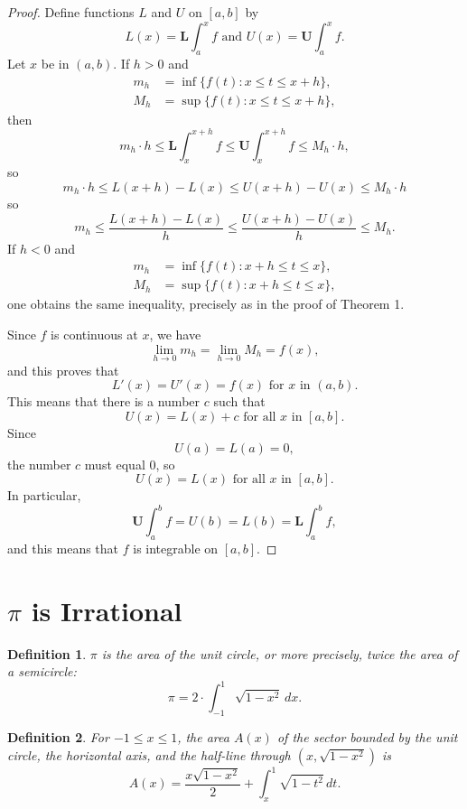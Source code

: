 \documentclass{article}
\numberwithin{corollary}{subsection}
\newtheorem{definition}{Definition}
\numberwithin{definition}{subsection}
\numberwithin{lemma}{subsection}
\numberwithin{theorem}{subsection}
\begin{document}
\begin{proof}
  Define functions $L$ and $U$ on $[a, b]$ by \[
    L(x) = \textbf{L}\int_a^x f \text{ and } U(x) = \textbf{U}\int_a^x f.
  \] Let $x$ be in $(a, b)$. If $h > 0$ and
  \begin{align*}
    m_h &= \inf\{f(t): x \leq t \leq x + h\}, \\
    M_h &= \sup\{f(t): x \leq t \leq x + h\},
  \end{align*}
  then \[
    m_h \cdot h \leq \textbf{L}\int_x^{x + h} f \leq \textbf{U}\int_x^{x + h} f
    \leq M_h \cdot h,
  \] so \[
    m_h \cdot h \leq L(x + h) - L(x) \leq U(x + h) - U(x) \leq M_h \cdot h
  \] so \[
    m_h \leq \frac{L(x + h) - L(x)}{h} \leq \frac{U(x + h) - U(x)}{h} \leq M_h.
  \] If $h < 0$ and
  \begin{align*}
    m_h &= \inf\{f(t): x + h \leq t \leq x\}, \\
    M_h &= \sup\{f(t): x + h \leq t \leq x\},
  \end{align*}
  one obtains the same inequality, precisely as in the proof of
  Theorem 1.

  Since $f$ is continuous at $x$, we have \[
    \lim_{h \to 0} m_h = \lim_{h \to 0} M_h = f(x),
  \] and this proves that \[
    L'(x) = U'(x) = f(x) \text{ for } x \text{ in } (a, b).
  \] This means that there is a number $c$ such that \[
    U(x) = L(x) + c \text{ for all } x \text{ in } [a, b].
  \] Since \[
    U(a) = L(a) = 0,
  \] the number $c$ must equal 0, so \[
    U(x) = L(x) \text{ for all } x \text{ in } [a, b].
  \] In particular, \[
    \textbf{U}\int_a^b f = U(b) = L(b) = \textbf{L}\int_a^b f,
  \] and this means that $f$ is integrable on $[a, b]$.
\end{proof}

\section{$\pi$ is Irrational}

\begin{definition}
  $\pi$ is the area of the unit circle, or more precisely, twice the area of a
  semicircle: \[
    \pi = 2 \cdot \int_{-1}^1 \sqrt{1 - x^2} \,dx.
  \]
\end{definition}

\begin{definition}
  For $-1 \leq x \leq 1$, the area $A(x)$ of the sector bounded by the unit
  circle, the horizontal axis, and the half-line through $(x, \sqrt{1 - x^2})$
  is \[
    A(x) = \frac{x\sqrt{1 - x^2}}{2} + \int_x^1 \sqrt{1 - t^2} \,dt.
  \]
\end{definition}
\end{document}
